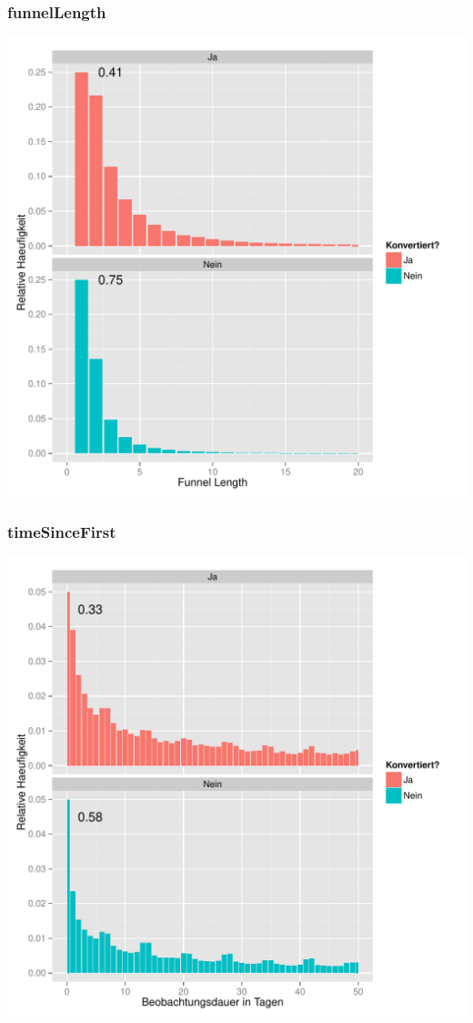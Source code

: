\begin{frame}\frametitle{funnelLength}
	    \centering\includegraphics[scale=0.3]{funnelLength_First.pdf}
\end{frame}

\begin{frame}\frametitle{timeSinceFirst}
	    \centering\includegraphics[scale=0.3]{timeSinceFirst_Last.pdf}
\end{frame}

